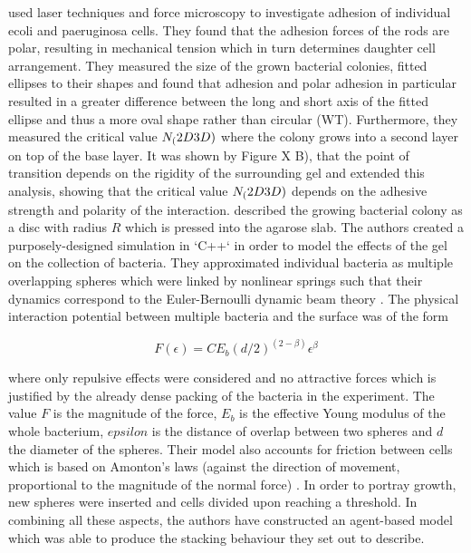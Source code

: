 \documentclass{article}
\begin{document}
\cite{Duvernoy2018} used laser techniques and force microscopy to investigate adhesion of individual
\ac{ecoli} and \ac{paeruginosa} cells.
They found that the adhesion forces of the rods are polar, resulting in mechanical tension which in
turn determines daughter cell arrangement.
They measured the size of the grown bacterial colonies, fitted ellipses to their shapes and found
that adhesion and polar adhesion in particular resulted in a greater difference between the long and
short axis of the fitted ellipse and thus a more oval shape rather than circular (WT).
Furthermore, they measured the critical value $N_(2D\/3D)$ where the colony grows into a second
layer on top of the base layer.
It was shown by \cite{Grant2014} Figure X B), that the point of transition
depends on the rigidity of the surrounding gel and \cite{Duvernoy2018} extended this analysis,
showing that the critical value $N_(2D\/3D)$ depends on the adhesive strength and polarity of the
interaction.
\cite{Grant2014} described the growing bacterial colony as a disc with radius $R$ which is pressed
into the agarose slab.
The authors created a purposely-designed simulation in `C++` in order to model the effects of the
gel on the collection of bacteria.
They approximated individual bacteria as multiple overlapping spheres which were linked by nonlinear
springs such that their dynamics correspond to the Euler-Bernoulli dynamic beam theory
\cite{HAN1999}.
The physical interaction potential between multiple bacteria and the surface was of the form

\begin{equation}
    F(\epsilon) = C E_b (d/2)^(2 - \beta) \epsilon^\beta
\end{equation}

where only repulsive effects were considered and no attractive forces which is justified by the
already dense packing of the bacteria in the experiment.
The value $F$ is the magnitude of the force, $E_b$ is the effective Young modulus of the whole
bacterium, $epsilon$ is the distance of overlap between two spheres and $d$ the diameter of the
spheres.
Their model also accounts for friction between cells which is based on Amonton's laws (against the
direction of movement, proportional to the magnitude of the normal force) \cite{Hutchings2021}.
In order to portray growth, new spheres were inserted and cells divided upon reaching a threshold.
In combining all these aspects, the authors have constructed an agent-based model which was able to
produce the stacking behaviour they set out to describe.
\end{document}
